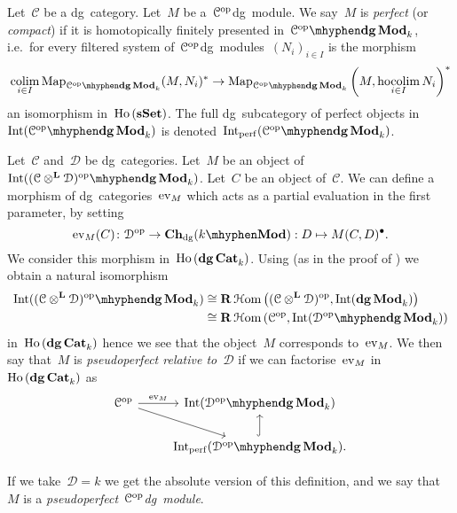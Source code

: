 \begin{refsection}
\begin{definition}
  Let~$\mathcal{C}$ be a dg~category. Let~$M$ be a~$\mathcal{C}^{\mathrm{op}}$\dash dg~module. We say~$M$ is \emph{perfect} (or \emph{compact}) if it is homotopically finitely presented in~${\mathcal{C}^\opp}\mhyphen\dgMod_k$, i.e.\ for every filtered system of~$\mathcal{C}^{\mathrm{op}}$\dash dg~modules~$(N_i)_{i\in I}$ is the morphism
  \begin{equation}
    \colim_{i\in I}\Map_{{\mathcal{C}^\opp}\mhyphen\dgMod_k}(M,N_i)^*\to\Map_{{\mathcal{C}^\opp}\mhyphen\dgMod_k}\left( M,\hocolim_{i\in I}N_i \right)^*
  \end{equation}
  an isomorphism in~$\operatorname{\mathrm{Ho} \,}(\mathbf{s\,\!\mathbf{Set}})$. The full dg~subcategory of perfect objects in~$\Int({\mathcal{C}^\opp}\mhyphen\dgMod_k)$ is denoted~$\Int_\perf({\mathcal{C}^\opp}\mhyphen\dgMod_k)$.
\end{definition}
\begin{definition}
  Let~$\mathcal{C}$ and~$\mathcal{D}$ be dg~categories. Let~$M$ be an object of~$\Int({(\mathcal{C}\otimes^{\mathbf{L}}\mathcal{D})^\opp}\mhyphen\dgMod_k)$. Let~$C$ be an object of~$\mathcal{C}$. We can define a morphism of dg~categories~$\operatorname{ev}_M$ which acts as a partial evaluation in the first parameter, by setting
  \begin{equation}
    \ev_M(C)\colon\mathcal{D}^\opp\to\Ch_\dg(k\mhyphen\Mod):D\mapsto M(C,D)^\bullet.
  \end{equation}
  We consider this morphism in~$\operatorname{\mathrm{Ho} \,}(\mathbf{dg\,Cat}_k)$. Using \cite[theorem 6.1]{toen} (as in the proof of \cite[corollary 7.6]{toen}) we obtain a natural isomorphism
  \begin{equation}
    \begin{aligned}
      \Int({(\mathcal{C}\otimes^{\mathbf{L}}\mathcal{D})^\opp}\mhyphen\dgMod_k)&\cong\RRRHHom\left( (\mathcal{C}\otimes^{\mathbf{L}}\mathcal{D})^\opp,\Int(\dgMod_k) \right) \\
      &\cong\RRRHHom\left( \mathcal{C}^\opp,\Int({\mathcal{D}^\opp}\mhyphen\dgMod_k) \right)
    \end{aligned}
  \end{equation}
  in~$\operatorname{\mathrm{Ho} \,}(\mathbf{dg\,Cat}_k)$ hence we see that the object~$M$ corresponds to~$\operatorname{ev}_M$. We then say that~$M$ is \emph{pseudoperfect relative to~$\mathcal{D}$} if we can factorise~$\operatorname{ev}_M$ in~$\operatorname{\mathrm{Ho} \,}(\mathbf{dg\,Cat}_k)$ as
  \begin{equation}
    \begin{tikzcd}
      \mathcal{C}^\opp \arrow{r}{\ev_M} \arrow{rd} & \Int({\mathcal{D}^\opp}\mhyphen\dgMod_k) \\
      & \Int_\perf({\mathcal{D}^\opp}\mhyphen\dgMod_k) \arrow[hook]{u}.
    \end{tikzcd}
  \end{equation}
\end{definition}
If we take~$\mathcal{D}=k$ we get the absolute version of this definition, and we say that $M$ is a \emph{pseudoperfect~$\mathcal{C}^{\mathrm{op}}$\dash dg~module}.


\end{refsection}
